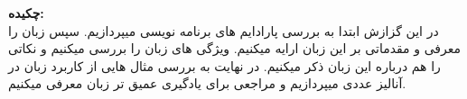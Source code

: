 \vspace*{-1cm}                   %
\thispagestyle{empty}
{\large \bf چکیده: }  
\vspace*{0.1cm}
\\
{\small}
در این گزازش ابتدا به بررسی پارادایم های برنامه نویسی میپردازیم. سپس زبان 
را معرفی و مقدماتی بر این زبان ارایه میکنیم. ویژگی های زبان را بررسی میکنیم و نکاتی را هم درباره این زبان ذکر میکنیم. در نهایت به بررسی مثال هایی از کاربرد زبان 
در آنالیز عددی میپردازیم و مراجعی برای یادگیری عمیق تر زبان معرفی میکنیم.
